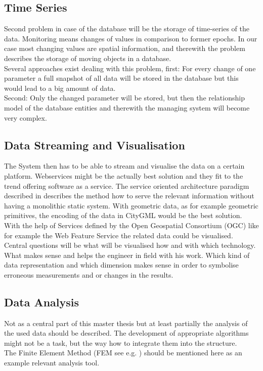 \subsection{Time Series}
Second problem in case of the database will be the storage of time-series of the data. Monitoring means changes of values in comparison to former epochs. In our case most changing values are spatial information, and therewith the problem describes the storage of moving objects in a database.\\
Several approaches exist dealing with this problem, first: For every change of one parameter a full snapshot of all data will be stored in the database but this would lead to a big amount of data.\\
Second: Only the changed parameter will be stored, but then the relationship model of the database entities and therewith the managing system will become very complex. \citep{erwig_spatio-temporal_1999}\citep{koubarakis_spatio-temporal_2003}\citep{yuan_temporal_1996}
\subsection{Data Streaming and Visualisation}
The System then has to be able to stream and visualise the data on a certain platform. Webservices might be the actually best solution and they fit to the trend offering software as a service. The service oriented architecture paradigm described in \citep{papazoglou_web_2008} describes the method how to serve the relevant information without having a monolithic static system. With geometric data, as for example geometric primitives, the encoding of the data in CityGML \citep{gerhard_groger_ogc_2012}\citep{kolbe_3d-geo-database_2009} would be the best solution. With the help of Services defined by the Open Geospatial Consortium (OGC) like for example the Web Feature Service \citep{panagiotis_a._vretanos_opengis_2005} \citep{jeff_de_la_beaujardiere_opengis_2006}\citep{douglas_nebert_opengis_2007}\citep{panagiotis_a._vretanos_opengis_2010}\citep{kolbe_draft_2009} the related data could be visualised.\\
Central questions will be what will be visualised how and with which technology. What makes sense and helps the engineer in field with his work. Which kind of data representation and which dimension makes sense in order to symbolise erroneous measurements and or changes in the results.
\subsection{Data Analysis}
Not as a central part of this master thesis but at least partially the analysis of the used data should be described. The development of appropriate algorithms might not be a task, but the way how to integrate them into the structure.\\
The Finite Element Method (FEM see e.g. \citep{zienkiewicz_finite_1977}) should be mentioned here as an example relevant analysis tool.
